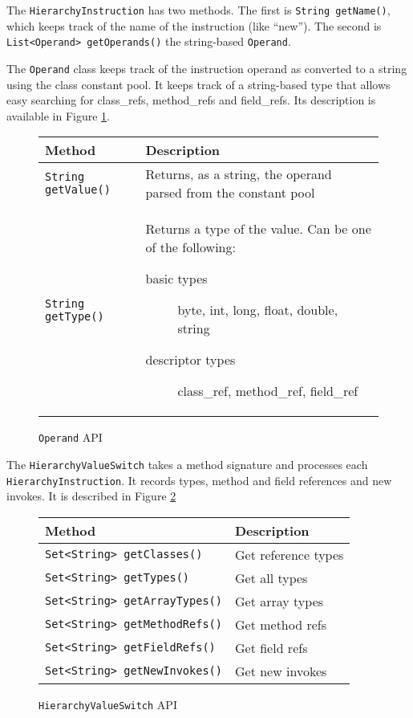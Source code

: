\documentclass[preprint]{sigplanconf}
\begin{document}
The {\tt HierarchyInstruction} has two methods. The first is {\tt String getName()}, which keeps track of the name of the instruction (like “new”). The second is {\tt List<Operand> getOperands()} the string-based {\tt Operand}.

The {\tt Operand} class keeps track of the instruction operand as converted to a string using the class constant pool. It keeps track of a string-based type that allows easy searching for class\_refs, method\_refs and field\_refs. Its description is available in Figure \ref{fig:operand}. 

\begin{figure}[htbf]
\begin{tabularx}{\columnwidth}{|lX|}
\hline
{\bf Method} & {\bf Description }\\\hline
{\tt String getValue()} &  Returns, as a string, the operand parsed 
    from the constant pool\\\hline 
{\tt String getType()} & Returns a type of the value. Can be one
    of the following:
    \begin{description}
      \item[basic types] byte, int, long, float, double, string
      \item[descriptor types] class\_ref, method\_ref, field\_ref
    \end{description}
\\\hline 
\end{tabularx}
\caption{{\tt Operand} API}
\label{fig:operand}
\end{figure}

The {\tt HierarchyValueSwitch} takes a method signature and processes each {\tt HierarchyInstruction}. It records types, method and field references and new invokes. It is described in Figure \ref{fig:hvsw}

\begin{figure}[htbf]
\begin{tabularx}{\columnwidth}{|lX|}
\hline
{\bf Method} & {\bf Description }\\\hline
{\tt Set<String> getClasses()} &  Get reference types\\\hline
{\tt Set<String> getTypes()} &  Get all types\\\hline
{\tt Set<String> getArrayTypes()} &  Get array types\\\hline
{\tt Set<String> getMethodRefs()} &  Get method refs\\\hline
{\tt Set<String> getFieldRefs()} &  Get field refs\\\hline
{\tt Set<String> getNewInvokes()} &  Get new invokes\\\hline
\end{tabularx}
\caption{{\tt HierarchyValueSwitch} API}
\label{fig:hvsw}
\end{figure}
\end{document}
